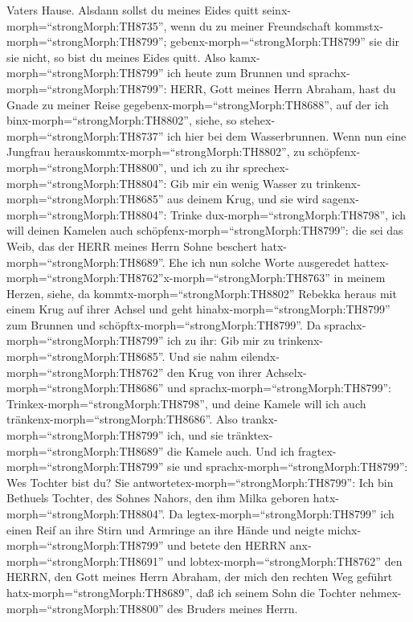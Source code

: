 Vaters Hause.  Alsdann sollst du meines Eides quitt
seinx-morph=``strongMorph:TH8735'', wenn du zu meiner Freundschaft
kommstx-morph=``strongMorph:TH8799'';
gebenx-morph=``strongMorph:TH8799'' sie dir sie nicht, so bist du meines
Eides quitt.  Also kamx-morph=``strongMorph:TH8799'' ich
heute zum Brunnen und sprachx-morph=``strongMorph:TH8799'': HERR, Gott
meines Herrn Abraham, hast du Gnade zu meiner Reise
gegebenx-morph=``strongMorph:TH8688'', auf der ich
binx-morph=``strongMorph:TH8802'',  siehe, so
stehex-morph=``strongMorph:TH8737'' ich hier bei dem Wasserbrunnen. Wenn
nun eine Jungfrau herauskommtx-morph=``strongMorph:TH8802'', zu
schöpfenx-morph=``strongMorph:TH8800'', und ich zu ihr
sprechex-morph=``strongMorph:TH8804'': Gib mir ein wenig Wasser zu
trinkenx-morph=``strongMorph:TH8685'' aus deinem Krug,  und
sie wird sagenx-morph=``strongMorph:TH8804'': Trinke
dux-morph=``strongMorph:TH8798'', ich will deinen Kamelen auch
schöpfenx-morph=``strongMorph:TH8799'': die sei das Weib, das der HERR
meines Herrn Sohne beschert hatx-morph=``strongMorph:TH8689''.
 Ehe ich nun solche Worte ausgeredet
hattex-morph=``strongMorph:TH8762''x-morph=``strongMorph:TH8763'' in
meinem Herzen, siehe, da kommtx-morph=``strongMorph:TH8802'' Rebekka
heraus mit einem Krug auf ihrer Achsel und geht
hinabx-morph=``strongMorph:TH8799'' zum Brunnen und
schöpftx-morph=``strongMorph:TH8799''. Da
sprachx-morph=``strongMorph:TH8799'' ich zu ihr: Gib mir zu
trinkenx-morph=``strongMorph:TH8685''.  Und sie nahm
eilendx-morph=``strongMorph:TH8762'' den Krug von ihrer
Achselx-morph=``strongMorph:TH8686'' und
sprachx-morph=``strongMorph:TH8799'':
Trinkex-morph=``strongMorph:TH8798'', und deine Kamele will ich auch
tränkenx-morph=``strongMorph:TH8686''. Also
trankx-morph=``strongMorph:TH8799'' ich, und sie
tränktex-morph=``strongMorph:TH8689'' die Kamele auch.  Und
ich fragtex-morph=``strongMorph:TH8799'' sie und
sprachx-morph=``strongMorph:TH8799'': Wes Tochter bist du? Sie
antwortetex-morph=``strongMorph:TH8799'': Ich bin Bethuels Tochter, des
Sohnes Nahors, den ihm Milka geboren hatx-morph=``strongMorph:TH8804''.
Da legtex-morph=``strongMorph:TH8799'' ich einen Reif an ihre Stirn und
Armringe an ihre Hände  und neigte
michx-morph=``strongMorph:TH8799'' und betete den HERRN
anx-morph=``strongMorph:TH8691'' und lobtex-morph=``strongMorph:TH8762''
den HERRN, den Gott meines Herrn Abraham, der mich den rechten Weg
geführt hatx-morph=``strongMorph:TH8689'', daß ich seinem Sohn die
Tochter nehmex-morph=``strongMorph:TH8800'' des Bruders meines Herrn.
